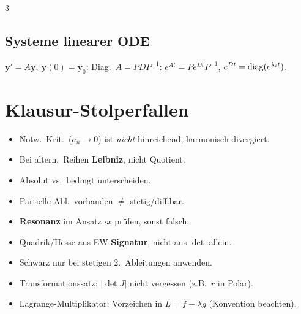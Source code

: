 \documentclass[8pt,a4paper]{extarticle}
\begin{document}
\begin{multicols*}{3}
\subsection{Systeme linearer ODE}
$\mathbf y'=A\mathbf y,\ \mathbf y(0)=\mathbf y_0$:
Diag.\ $A=PDP^{-1}$: $e^{At}=Pe^{Dt}P^{-1}$, $e^{Dt}=\operatorname{diag}(e^{\lambda_i t})$.

\section{Klausur-Stolperfallen}
\begin{itemize}
\item Notw.\ Krit.\ ($a_n\!\to\!0$) ist \emph{nicht} hinreichend; harmonisch divergiert.
\item Bei altern.\ Reihen \textbf{Leibniz}, nicht Quotient.
\item Absolut vs.\ bedingt unterscheiden.
\item Partielle Abl.\ vorhanden $\ne$ stetig/diff.bar.
\item \textbf{Resonanz} im Ansatz $\cdot x$ pr\"ufen, sonst falsch.
\item Quadrik/Hesse aus EW-\textbf{Signatur}, nicht aus $\det$ allein.
\item Schwarz nur bei stetigen 2.\ Ableitungen anwenden.
\item Transformationssatz: $|\det J|$ nicht vergessen (z.B.\ $r$ in Polar).
\item Lagrange-Multiplikator: Vorzeichen in $L=f-\lambda g$ (Konvention beachten).
\end{itemize}

\end{multicols*}
\end{document}
